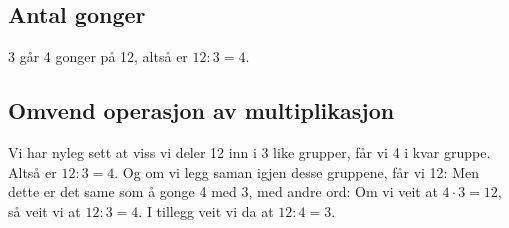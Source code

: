 \subsection*{Antal gonger}
3 går 4 gonger på 12, altså er $ 12:3=4 $.


\subsection*{Omvend operasjon av multiplikasjon}
Vi har nyleg sett at viss vi deler 12 inn i 3 like grupper, får vi 4 i kvar gruppe. Altså er $ 12:3=4$. Og om vi legg saman igjen desse gruppene, får vi 12: 
Men dette er det same som å gonge 4 med 3, med andre ord:
Om vi veit at $ {4\cdot 3=12} $, så veit vi at $ {12:3=4} $. I tillegg veit vi da at $ {12:4=3} $. 





